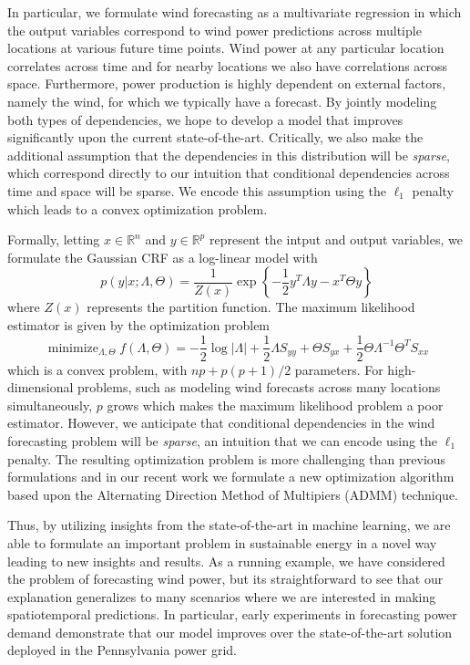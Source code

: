 \documentclass[12pt]{article}
\DeclareMathOperator*{\minimize}{\mathrm{minimize}}
\begin{document}
In particular, we formulate wind forecasting as a multivariate regression in which the output variables correspond to wind power predictions across multiple locations at various future time points. Wind power at any particular location correlates across time and for nearby locations we also have correlations across space. Furthermore, power production is highly dependent on external factors, namely the wind, for which we typically have a forecast. By jointly modeling both types of dependencies, we hope to develop a model that improves significantly upon the current state-of-the-art. Critically, we also make the additional assumption that the dependencies in this distribution will be \emph{sparse}, which correspond directly to our intuition that conditional dependencies across time and space will be sparse. We encode this assumption using the $\ell_1$ penalty which leads to a convex optimization problem.

Formally, letting $x \in \mathbb{R}^n$ and $y \in \mathbb{R}^p$ represent the intput and output variables, we formulate the Gaussian CRF as a log-linear model with
\begin{equation}
p(y|x;\Lambda,\Theta) = \frac{1}{Z(x)}\exp \left \{ -\frac{1}{2}y^T\Lambda y - x^T\Theta y \right \}
\end{equation}
where $Z(x)$ represents the partition function. The maximum likelihood estimator is given by the optimization problem
\begin{equation}
\minimize_{\Lambda,\Theta} f(\Lambda,\Theta) = -\frac{1}{2}\log |\Lambda| + \frac{1}{2}\Lambda S_{yy} + \Theta S_{yx} + \frac{1}{2}\Theta\Lambda^{-1}\Theta^TS_{xx}
\end{equation}
which is a convex problem, with $np + p(p+1)/2$ parameters. For high-dimensional problems, such as modeling wind forecasts across many locations simultaneously, $p$ grows which makes the maximum likelihood problem a poor estimator. However, we anticipate that conditional dependencies in the wind forecasting problem will be \emph{sparse}, an intuition that we can encode using the $\ell_1$ penalty. The resulting optimization problem is more challenging than previous formulations and in our recent work we formulate a new optimization algorithm based upon the Alternating Direction Method of Multipiers (ADMM) technique.

Thus, by utilizing insights from the state-of-the-art in machine learning, we are able to formulate an important problem in sustainable energy in a novel way leading to new insights and results. As a running example, we have considered the problem of forecasting wind power, but its straightforward to see that our explanation generalizes to many scenarios where we are interested in making spatiotemporal predictions. In particular, early experiments in forecasting power demand demonstrate that our model improves over the state-of-the-art solution deployed in the Pennsylvania power grid. 
\end{document}
